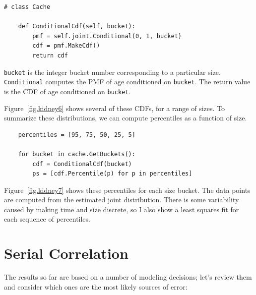 \documentclass[12pt]{book}
\begin{document}
\begin{verbatim}
# class Cache

    def ConditionalCdf(self, bucket):
        pmf = self.joint.Conditional(0, 1, bucket)
        cdf = pmf.MakeCdf()
        return cdf
\end{verbatim}

\verb"bucket" is the integer bucket number corresponding to a
particular size.  {\tt Conditional} computes the
PMF of age conditioned on {\tt bucket}.
The return value is the CDF of age conditioned on {\tt bucket}.

Figure~\ref{fig.kidney6} shows several of these CDFs, for
a range of sizes.  To summarize these distributions, we can
compute percentiles as a function of size.

\begin{verbatim}
    percentiles = [95, 75, 50, 25, 5]

    for bucket in cache.GetBuckets():
        cdf = ConditionalCdf(bucket)      
        ps = [cdf.Percentile(p) for p in percentiles]
\end{verbatim}

Figure~\ref{fig.kidney7} shows these percentiles for each
size bucket.  The data points are computed from the estimated
joint distribution.  There is some variability caused by making
time and size discrete, so I also show a least squares fit for
each sequence of percentiles.


\section{Serial Correlation}
\label{serial}

The results so far are based on a number of modeling decisions;
let's review them and consider which ones are the most
likely sources of error:
\end{document}
